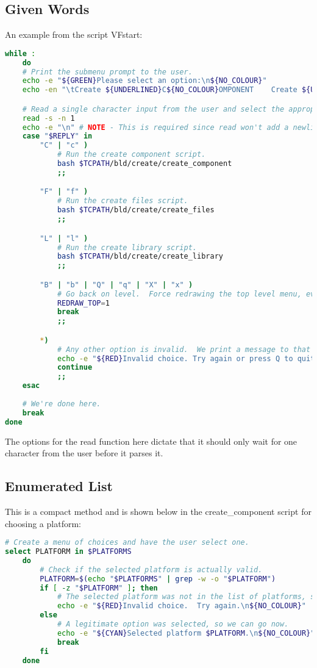\documentclass[a4paper, oneside, 11pt, titlepage, onecolumn, openright]{report}
\begin{document}
\subsection{Given Words}
			\label{ss:GivenWords}
			An example from the script VFstart:
			
\begin{lstlisting}[frame=trBL, breaklines=true, language = bash]
while :
	do
	# Print the submenu prompt to the user.
	echo -e "${GREEN}Please select an option:\n${NO_COLOUR}"
	echo -en "\tCreate ${UNDERLINED}C${NO_COLOUR}OMPONENT    Create ${UNDERLINED}F${NO_COLOUR}ILES    Create ${UNDERLINED}L${NO_COLOUR}IBRARY    ${UNDERLINED}B${NO_COLOUR}ACK"

	# Read a single character input from the user and select the appropriate response.
	read -s -n 1
	echo -e "\n" # NOTE - This is required since read won't add a newline after reading a single character.
	case "$REPLY" in
		"C" | "c" )
			# Run the create component script.
			bash $TCPATH/bld/create/create_component
			;;

		"F" | "f" )
			# Run the create files script.
			bash $TCPATH/bld/create/create_files
			;;

		"L" | "l" )
			# Run the create library script.
			bash $TCPATH/bld/create/create_library
			;;

		"B" | "b" | "Q" | "q" | "X" | "x" )
			# Go back on level.  Force redrawing the top level menu, even if we aren't in block mode.
			REDRAW_TOP=1
			break
			;;

		*)
			# Any other option is invalid.  We print a message to that effect and try again.
			echo -e "${RED}Invalid choice. Try again or press Q to quit.\n${NO_COLOUR}"
			continue
			;;
	esac
				
	# We're done here.
	break
done		        
\end{lstlisting}

				The options for the read function here dictate that it should only wait for one character from the user before it parses it.

\subsection{Enumerated List}
			\label{ss:EnumeratedList}	
				This is a compact method and is shown below in the create\_component script for choosing a platform:
				
\begin{lstlisting}[frame=trBL, breaklines=true, language = bash]				
# Create a menu of choices and have the user select one.
select PLATFORM in $PLATFORMS
	do
		# Check if the selected platform is actually valid.
		PLATFORM=$(echo "$PLATFORMS" | grep -w -o "$PLATFORM")
		if [ -z "$PLATFORM" ]; then
			# The selected platform was not in the list of platforms, so the user is apparently a moron.
			echo -e "${RED}Invalid choice.  Try again.\n${NO_COLOUR}"
		else
			# A legitimate option was selected, so we can go now.
			echo -e "${CYAN}Selected platform $PLATFORM.\n${NO_COLOUR}"
			break
		fi
	done				
\end{lstlisting}			
\end{document}
